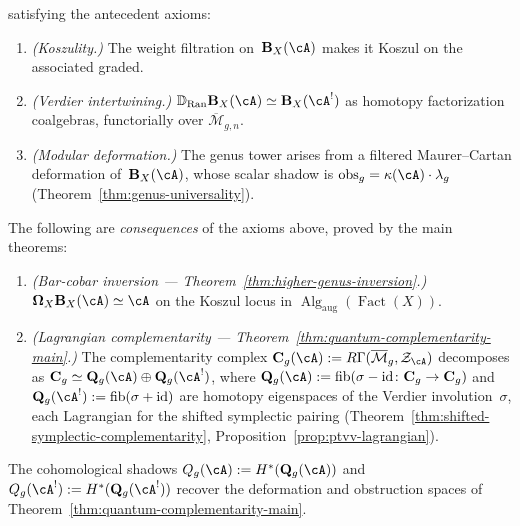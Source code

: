 \begin{definition}
\noindent satisfying the antecedent axioms:
\begin{enumerate}[label=\textup{(MK\arabic*$_\infty$)}]
\item\label{MK:koszul-htpy}
\emph{(Koszulity.)}
The weight filtration on~$\mathbf{B}_X(\cA)$ makes it Koszul on
the associated graded.

\item\label{MK:verdier-htpy}
\emph{(Verdier intertwining.)}
$\mathbb{D}_{\operatorname{Ran}} \mathbf{B}_X(\cA) \simeq
\mathbf{B}_X(\cA^!)$
as homotopy factorization coalgebras, functorially over
$\overline{\mathcal{M}}_{g,n}$.

\item\label{MK:modular-htpy}
\emph{(Modular deformation.)}
The genus tower arises from a filtered Maurer--Cartan deformation
of~$\mathbf{B}_X(\cA)$, whose scalar shadow is
$\mathrm{obs}_g = \kappa(\cA) \cdot \lambda_g$
\textup{(}Theorem~\textup{\ref{thm:genus-universality})}.
\end{enumerate}

\noindent The following are \emph{consequences} of the axioms above,
proved by the main theorems:
\begin{enumerate}[label=\textup{(MK\arabic*$_\infty$)},start=4]
\item\label{MK:inversion-htpy}
\emph{(Bar-cobar inversion --- Theorem~\textup{\ref{thm:higher-genus-inversion}}.)}
$\boldsymbol{\Omega}_X \mathbf{B}_X(\cA) \simeq \cA$
on the Koszul locus in
$\operatorname{Alg}_{\mathrm{aug}}(\operatorname{Fact}(X))$.

\item\label{MK:complementarity-htpy}
\emph{(Lagrangian complementarity --- Theorem~\textup{\ref{thm:quantum-complementarity-main}}.)}
The complementarity complex
$\mathbf{C}_g(\cA) := R\Gamma(\overline{\mathcal{M}}_g, \mathcal{Z}_{\cA})$
decomposes as
$\mathbf{C}_g \simeq \mathbf{Q}_g(\cA) \oplus \mathbf{Q}_g(\cA^!)$,
where $\mathbf{Q}_g(\cA) := \operatorname{fib}(\sigma - \mathrm{id}
\colon \mathbf{C}_g \to \mathbf{C}_g)$ and
$\mathbf{Q}_g(\cA^!) := \operatorname{fib}(\sigma + \mathrm{id})$
are homotopy eigenspaces of the Verdier involution~$\sigma$, each
Lagrangian for the shifted symplectic pairing
\textup{(}Theorem~\textup{\ref{thm:shifted-symplectic-complementarity},}
Proposition~\textup{\ref{prop:ptvv-lagrangian})}.
\end{enumerate}
The cohomological shadows
$Q_g(\cA) := H^*(\mathbf{Q}_g(\cA))$ and
$Q_g(\cA^!) := H^*(\mathbf{Q}_g(\cA^!))$ recover the
deformation and obstruction spaces of
Theorem~\ref{thm:quantum-complementarity-main}.
\end{definition}

